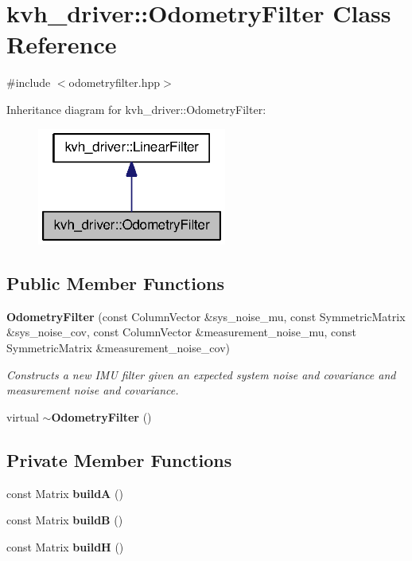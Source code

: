 \section{kvh\-\_\-driver\-:\-:\-Odometry\-Filter \-Class \-Reference}
\label{classkvh__driver_1_1OdometryFilter}


{\ttfamily \#include $<$odometryfilter.\-hpp$>$}



\-Inheritance diagram for kvh\-\_\-driver\-:\-:\-Odometry\-Filter\-:
\nopagebreak
\begin{figure}[H]
\begin{center}
\leavevmode
\includegraphics[width=176pt]{classkvh__driver_1_1OdometryFilter__inherit__graph}
\end{center}
\end{figure}
\subsection*{\-Public \-Member \-Functions}
\begin{DoxyCompactItemize}
\item 
{\bf \-Odometry\-Filter} (const \-Column\-Vector \&sys\-\_\-noise\-\_\-mu, const \-Symmetric\-Matrix \&sys\-\_\-noise\-\_\-cov, const \-Column\-Vector \&measurement\-\_\-noise\-\_\-mu, const \-Symmetric\-Matrix \&measurement\-\_\-noise\-\_\-cov)
\begin{DoxyCompactList}\small\item\em \-Constructs a new \-I\-M\-U filter given an expected system noise and covariance and measurement noise and covariance. \end{DoxyCompactList}\item 
virtual {\bf $\sim$\-Odometry\-Filter} ()
\end{DoxyCompactItemize}
\subsection*{\-Private \-Member \-Functions}
\begin{DoxyCompactItemize}
\item 
const \-Matrix {\bf build\-A} ()
\item 
const \-Matrix {\bf build\-B} ()
\item 
const \-Matrix {\bf build\-H} ()
\end{DoxyCompactItemize}


